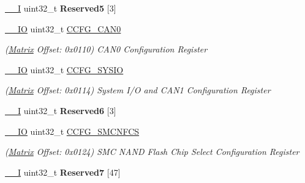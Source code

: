 \begin{DoxyCompactItemize}
\mbox{\label{structMatrix_a4a4337a1319ec579bd9d37ca58d7c709}} 
\mbox{\hyperlink{core__cm7_8h_af63697ed9952cc71e1225efe205f6cd3}{\+\_\+\+\_\+I}} uint32\+\_\+t {\bfseries Reserved5} \mbox{[}3\mbox{]}
\item 
\mbox{\label{structMatrix_a03471c08cd14ee4dc3d6afdaa19b3d84}} 
\mbox{\hyperlink{core__cm7_8h_aec43007d9998a0a0e01faede4133d6be}{\+\_\+\+\_\+\+IO}} uint32\+\_\+t \mbox{\hyperlink{structMatrix_a03471c08cd14ee4dc3d6afdaa19b3d84}{C\+C\+F\+G\+\_\+\+C\+A\+N0}}
\begin{DoxyCompactList}\small\item\em (\mbox{\hyperlink{structMatrix}{Matrix}} Offset\+: 0x0110) C\+A\+N0 Configuration Register \end{DoxyCompactList}\item 
\mbox{\hyperlink{core__cm7_8h_aec43007d9998a0a0e01faede4133d6be}{\+\_\+\+\_\+\+IO}} uint32\+\_\+t \mbox{\hyperlink{structMatrix_a3a8e2989ab1cad756bed54dd6b6345a8}{C\+C\+F\+G\+\_\+\+S\+Y\+S\+IO}}
\begin{DoxyCompactList}\small\item\em (\mbox{\hyperlink{structMatrix}{Matrix}} Offset\+: 0x0114) System I/O and C\+A\+N1 Configuration Register \end{DoxyCompactList}\item 
\mbox{\label{structMatrix_a9d2763045a3c2d890ed5ead5f31cd221}} 
\mbox{\hyperlink{core__cm7_8h_af63697ed9952cc71e1225efe205f6cd3}{\+\_\+\+\_\+I}} uint32\+\_\+t {\bfseries Reserved6} \mbox{[}3\mbox{]}
\item 
\mbox{\label{structMatrix_af08b5a6974bb9122974a2942ac2f30db}} 
\mbox{\hyperlink{core__cm7_8h_aec43007d9998a0a0e01faede4133d6be}{\+\_\+\+\_\+\+IO}} uint32\+\_\+t \mbox{\hyperlink{structMatrix_af08b5a6974bb9122974a2942ac2f30db}{C\+C\+F\+G\+\_\+\+S\+M\+C\+N\+F\+CS}}
\begin{DoxyCompactList}\small\item\em (\mbox{\hyperlink{structMatrix}{Matrix}} Offset\+: 0x0124) S\+MC N\+A\+ND Flash Chip Select Configuration Register \end{DoxyCompactList}\item 
\mbox{\label{structMatrix_a6fb608f3ffb4e822512469421179bfc3}} 
\mbox{\hyperlink{core__cm7_8h_af63697ed9952cc71e1225efe205f6cd3}{\+\_\+\+\_\+I}} uint32\+\_\+t {\bfseries Reserved7} \mbox{[}47\mbox{]}

\end{DoxyCompactItemize}
